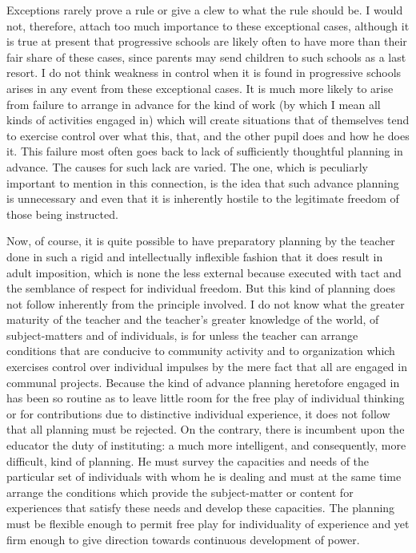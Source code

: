 Exceptions rarely prove a rule or give a clew to what the rule should be. I would not, 
therefore, attach too much importance to these exceptional cases, although it is true at 
present that progressive schools are likely often to have more than their fair share of these 
cases, since parents may send children to such schools as a last resort. I do not think 
weakness in control when it is found in progressive schools arises in any event from these 
exceptional cases. It is much more likely to arise from failure to arrange in advance for 
the kind of work (by which I mean all kinds of activities engaged in) which will create 
situations that of themselves tend to exercise control over what this, that, and the other 
pupil does and how he does it. This failure most often goes back to lack of sufficiently 
thoughtful planning in advance. The causes for such lack are varied. The one, which is 
peculiarly important to mention in this connection, is the idea that such advance planning 
is unnecessary and even that it is inherently hostile to the legitimate freedom of those 
being instructed. 

Now, of course, it is quite possible to have preparatory planning by the teacher done in 
such a rigid and intellectually inflexible fashion that it does result in adult imposition, 
which is none the less external because executed with tact and the semblance of respect 
for individual freedom. But this kind of planning does not follow inherently from the 
principle involved. I do not know what the greater maturity of the teacher and the 
teacher's greater knowledge of the world, of subject-matters and of individuals, is for 
unless the teacher can arrange conditions that are conducive to community activity and to 
organization which exercises control over individual impulses by the mere fact that all 
are engaged in communal projects. Because the kind of advance planning heretofore 
engaged in has been so routine as to leave little room for the free play of individual 
thinking or for contributions due to distinctive individual experience, it does not follow 
that all planning must be rejected. On the contrary, there is incumbent upon the educator the duty of instituting: a much more intelligent, and consequently, more difficult, kind of 
planning. He must survey the capacities and needs of the particular set of individuals with 
whom he is dealing and must at the same time arrange the conditions which provide the 
subject-matter or content for experiences that satisfy these needs and develop these 
capacities. The planning must be flexible enough to permit free play for individuality of 
experience and yet firm enough to give direction towards continuous development of 
power. 

